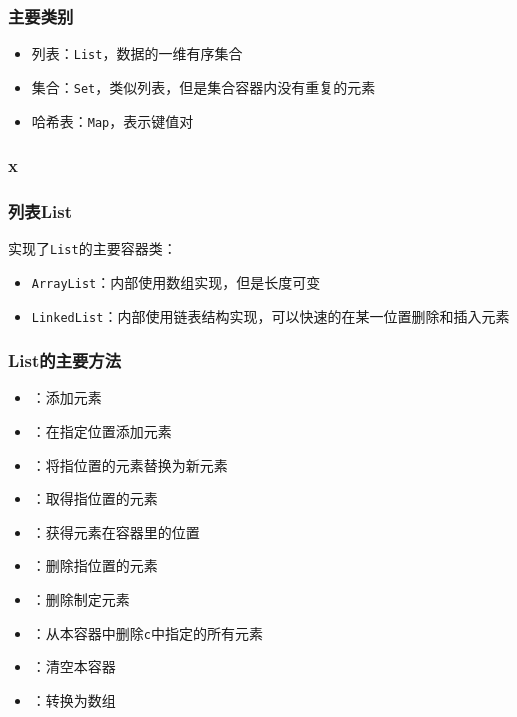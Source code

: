 \begin{frame}
  \frametitle{主要类别}
  \begin{itemize}
    \item 列表：\texttt{List}，数据的一维有序集合
    \item 集合：\texttt{Set}，类似列表，但是集合容器内没有重复的元素
    \item 哈希表：\texttt{Map}，表示键值对
  \end{itemize}
\end{frame}

\begin{frame}
  \frametitle{x}
\end{frame}

\begin{frame}
  \frametitle{列表List}
  实现了\texttt{List}的主要容器类：
  \begin{itemize}
    \item \texttt{ArrayList}：内部使用数组实现，但是长度可变
    \item \texttt{LinkedList}：内部使用链表结构实现，可以快速的在某一位置删除和插入元素
  \end{itemize}
\end{frame}

\begin{frame}
  \frametitle{List的主要方法}
   \begin{itemize}
    \item {}：添加元素
    \item {}：在指定位置添加元素
    \item {}：将指位置的元素替换为新元素
    \item {}：取得指位置的元素
    \item {}：获得元素在容器里的位置
    \item {}：删除指位置的元素
    \item {}：删除制定元素
    \item {}：从本容器中删除\texttt{c}中指定的所有元素
    \item {}：清空本容器
    \item {}：转换为数组
  \end{itemize}

\end{frame}


